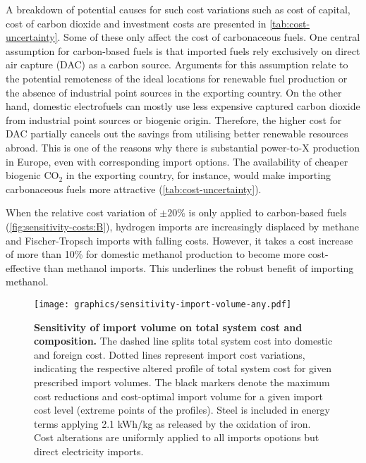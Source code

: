 \documentclass[5p,10pt]{elsarticle}
\begin{document}
A breakdown of potential causes for such cost variations such as cost of
capital, cost of carbon dioxide and investment costs are presented in
\cref{tab:cost-uncertainty}. Some of these only affect the cost of
carbonaceous fuels. One central assumption for carbon-based fuels is that
imported fuels rely exclusively on direct air capture (DAC) as a carbon source.
Arguments for this assumption relate to the potential remoteness of the ideal
locations for renewable fuel production or the absence of industrial point
sources in the exporting country. On the other hand, domestic electrofuels can
mostly use less expensive captured carbon dioxide from industrial point sources
or biogenic origin. Therefore, the higher cost for DAC partially cancels out the
savings from utilising better renewable resources abroad. This is one of the
reasons why there is substantial power-to-X production in Europe, even with
corresponding import options. The availability of cheaper biogenic CO$_2$ in the
exporting country, for instance, would make importing carbonaceous fuels more
attractive (\cref{tab:cost-uncertainty}).

When the relative cost variation of $\pm 20\%$ is only applied to carbon-based
fuels (\cref{fig:sensitivity-costs:B}), hydrogen imports are increasingly
displaced by methane and Fischer-Tropsch imports with falling costs. However, it
takes a cost increase of more than 10\% for domestic methanol production to
become more cost-effective than methanol imports. This underlines the robust
benefit of importing methanol.


\begin{figure*} 
    \texttt{[image: graphics/sensitivity-import-volume-any.pdf]}
    \caption{\textbf{Sensitivity of import volume on total system cost and composition.}
        The dashed line splits total system cost into domestic and foreign cost.
        Dotted lines represent import cost variations, indicating the respective
        altered profile of total system cost for given prescribed import
        volumes. The black markers denote the maximum cost reductions and
        cost-optimal import volume for a given import cost level (extreme points
        of the profiles). Steel is included in energy terms applying 2.1 kWh/kg
        as released by the oxidation of iron. Cost alterations are uniformly
        applied to all imports opotions but direct electricity imports. }
    \label{fig:sensitivity-volume}
\end{figure*}
\end{document}
